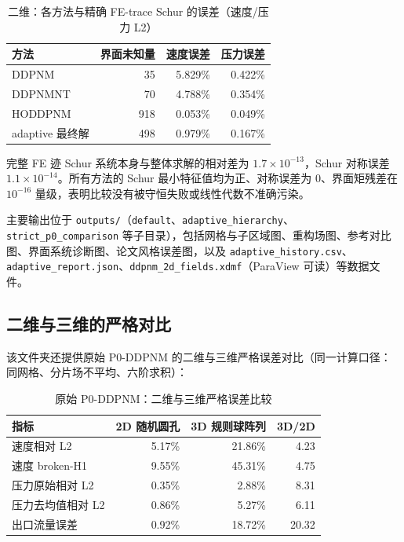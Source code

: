 \documentclass[11pt,a4paper]{ctexart}
\newcommand{\Dd}{DDPNM}
\begin{document}
\begin{table}[h]
\centering
\caption{二维：各方法与精确 FE-trace Schur 的误差（速度/压力 L2）}
\begin{tabular}{lrrr}
\toprule
方法 & 界面未知量 & 速度误差 & 压力误差 \\
\midrule
\Dd{}          & 35  & 5.829\% & 0.422\% \\
\Dd{}NT        & 70  & 4.788\% & 0.354\% \\
HODDPNM       & 918 & 0.053\% & 0.049\% \\
adaptive 最终解 & 498 & 0.979\% & 0.167\% \\
\bottomrule
\end{tabular}
\end{table}

完整 FE 迹 Schur 系统本身与整体求解的相对差为 $1.7\times10^{-13}$，Schur 对称误差 $1.1\times10^{-14}$。所有方法的 Schur 最小特征值均为正、对称误差为 0、界面矩残差在 $10^{-16}$ 量级，表明比较没有被守恒失败或线性代数不准确污染。

主要输出位于 \texttt{outputs/}（\texttt{default}、\texttt{adaptive\_hierarchy}、\texttt{strict\_p0\_comparison} 等子目录），包括网格与子区域图、重构场图、参考对比图、界面系统诊断图、论文风格误差图，以及 \texttt{adaptive\_history.csv}、\texttt{adaptive\_report.json}、\texttt{ddpnm\_2d\_fields.xdmf}（ParaView 可读）等数据文件。

\subsection{二维与三维的严格对比}
\label{sec:2d-vs-3d}

该文件夹还提供原始 P0-\Dd{} 的二维与三维严格误差对比（同一计算口径：同网格、分片场不平均、六阶求积）：

\begin{table}[h]
\centering
\caption{原始 P0-\Dd{}：二维与三维严格误差比较}
\begin{tabular}{lrrr}
\toprule
指标 & 2D 随机圆孔 & 3D 规则球阵列 & 3D/2D \\
\midrule
速度相对 L2    & 5.17\%  & 21.86\% & 4.23 \\
速度 broken-H1 & 9.55\%  & 45.31\% & 4.75 \\
压力原始相对 L2 & 0.35\%  & 2.88\%  & 8.31 \\
压力去均值相对 L2 & 0.86\% & 5.27\%  & 6.11 \\
出口流量误差    & 0.92\%  & 18.72\% & 20.32 \\
\bottomrule
\end{tabular}
\end{table}
\end{document}
